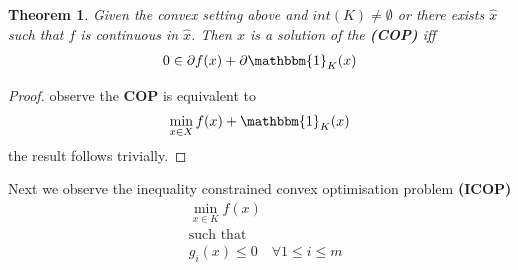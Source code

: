 \documentclass[a4paper,12pt,oneside,fleqn]{book}
\newtheorem{theorem}{Theorem}[section]
\theoremstyle{definition}
\theoremstyle{remark}
\begin{document}
\begin{theorem}
	Given the convex setting above and $int (K) \neq \emptyset$ or there exists $\hat{x}$ such that $f$ is continuous in $\hat{x}$. Then $x$ is a solution of the \textbf{(COP)} iff
	\begin{align*}
		0 \in \partial f(x) + \partial \mathbbm{1}_{K}(x)
	\end{align*}
\end{theorem}
\begin{proof}
	observe the \textbf{COP} is equivalent to 
	\begin{align*}
		\min_{x \in X} f(x) + \mathbbm{1}_{K}(x)
	\end{align*}
	the result follows trivially.
\end{proof}

 Next we observe the inequality constrained convex optimisation problem \textbf{(ICOP)}
 \begin{align*}
 	&\min_{x \in K} f(x)\\
 	&\text{such that}\\
 	&g_i(x) \le 0 \quad \forall 1 \le i \le m 
 \end{align*}
 
\end{document}
